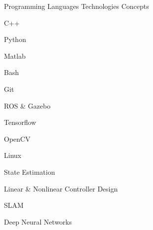 
\begin{cventries}

  \cventrycol
  {Programming Languages}
  {Technologies}
  {Concepts}
  {
    \begin{cvitems}
      \item {C++}
      \item {Python}
      \item {Matlab}
      \item {Bash}
    \end{cvitems}
  }
  {
    \begin{cvitems}
      \item {Git}
      \item {ROS \& Gazebo}
      \item {Tensorflow}
      \item {OpenCV}
      \item {Linux}
    \end{cvitems}
  }
  {
    \begin{cvitems}
      \item {State Estimation}
      \item {Linear \& Nonlinear Controller Design}
      \item {SLAM}
      \item {Deep Neural Networks}
    \end{cvitems}
  }

\end{cventries}


